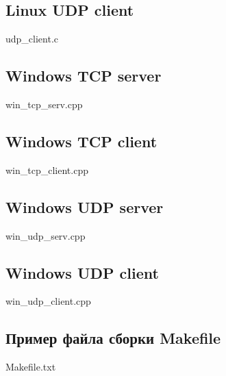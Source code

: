 \documentclass[12pt,a4paper]{report}
\begin{document}
\subsection*{Linux UDP client}

{udp_client.c}
\subsection*{Windows TCP server}

{win_tcp_serv.cpp}
\subsection*{Windows TCP client}

{win_tcp_client.cpp}
\subsection*{Windows UDP server}

{win_udp_serv.cpp}
\subsection*{Windows UDP client}

{win_udp_client.cpp}
\subsection*{Пример файла сборки Makefile}

{Makefile.txt}
\end{document}
